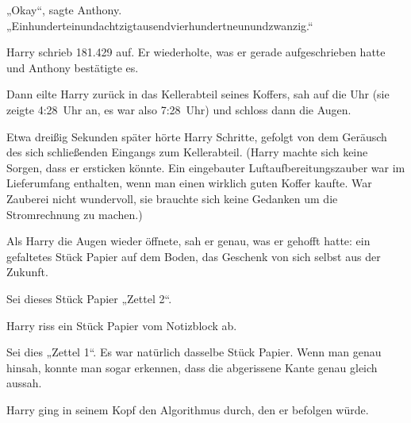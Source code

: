 „Okay“, sagte Anthony.
„Einhunderteinundachtzigtausendvierhundertneunundzwanzig.“

Harry schrieb 181.429 auf. Er wiederholte, was er gerade aufgeschrieben hatte und Anthony bestätigte es.

Dann eilte Harry zurück in das Kellerabteil seines Koffers, sah auf die Uhr (sie zeigte 4:28~Uhr an, es war also 7:28~Uhr) und schloss dann die Augen.

Etwa dreißig Sekunden später hörte Harry Schritte, gefolgt von dem Geräusch des sich schließenden Eingangs zum Kellerabteil. (Harry machte sich keine Sorgen, dass er ersticken könnte. Ein eingebauter Luftaufbereitungszauber war im Lieferumfang enthalten, wenn man einen wirklich guten Koffer kaufte. War Zauberei nicht wundervoll, sie brauchte sich keine Gedanken um die Stromrechnung zu machen.)

Als Harry die Augen wieder öffnete, sah er genau, was er gehofft hatte: ein gefaltetes Stück Papier auf dem Boden, das Geschenk von sich selbst aus der Zukunft.

Sei dieses Stück Papier
„Zettel 2“.

Harry riss ein Stück Papier vom Notizblock ab.

Sei dies
„Zettel 1“. Es war natürlich dasselbe Stück Papier. Wenn man genau hinsah, konnte man sogar erkennen, dass die abgerissene Kante genau gleich aussah.

Harry ging in seinem Kopf den Algorithmus durch, den er befolgen würde.

